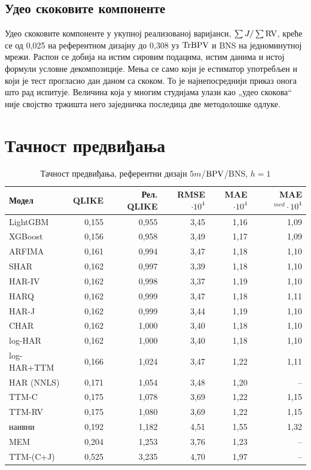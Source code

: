 \subsection{Удео скоковите компоненте}

Удео скоковите компоненте у укупној реализованој варијанси, $\sum J / \sum \mathrm{RV}$, креће
се од 0,025 на референтном дизајну до 0,308 уз $\mathrm{TrBPV}$ и BNS на једноминутној мрежи.
Распон се добија на истим сировим подацима, истим данима и истој формули условне
декомпозиције. Мења се само који је естиматор употребљен и који је тест прогласио дан
даном са скоком. То је најнепосреднији приказ онога што рад испитује. Величина која у
многим студијама улази као „удео скокова“ није својство тржишта него заједничка
последица две методолошке одлуке.

\section{Тачност предвиђања}
\label{sec:rez-tacnost}

\begin{table}[htbp]
\centering
\caption{Тачност предвиђања, референтни дизајн $5m$/$\mathrm{BPV}$/BNS, $h = 1$}
\label{tab:glavna-h1}
\begin{tabular}{lrrrrr}
\toprule
Модел & QLIKE & Рел. QLIKE & RMSE$\cdot10^{4}$ & MAE$\cdot10^{4}$ & MAE$^{med}\cdot10^{4}$ \\
\midrule
LightGBM      & 0,155 & 0,955 & 3,45 & 1,16 & 1,09 \\
XGBoost       & 0,156 & 0,958 & 3,49 & 1,17 & 1,09 \\
ARFIMA        & 0,161 & 0,994 & 3,47 & 1,18 & 1,10 \\
SHAR          & 0,162 & 0,997 & 3,39 & 1,18 & 1,10 \\
HAR-IV        & 0,162 & 0,998 & 3,37 & 1,19 & 1,10 \\
HARQ          & 0,162 & 0,999 & 3,47 & 1,18 & 1,11 \\
HAR-J         & 0,162 & 0,999 & 3,44 & 1,19 & 1,10 \\
CHAR          & 0,162 & 1,000 & 3,40 & 1,18 & 1,10 \\
log-HAR       & 0,162 & 1,000 & 3,40 & 1,18 & 1,10 \\
log-HAR+TTM   & 0,166 & 1,024 & 3,47 & 1,22 & 1,11 \\
HAR (NNLS)     & 0,171 & 1,054 & 3,48 & 1,20 & -- \\
TTM-C         & 0,175 & 1,078 & 3,69 & 1,22 & 1,15 \\
TTM-RV        & 0,175 & 1,080 & 3,69 & 1,22 & 1,15 \\
наивни        & 0,192 & 1,182 & 4,51 & 1,55 & 1,32 \\
MEM           & 0,204 & 1,253 & 3,76 & 1,23 & -- \\
TTM-(C+J)     & 0,525 & 3,235 & 4,70 & 1,97 & -- \\
\bottomrule
\end{tabular}
\end{table}

